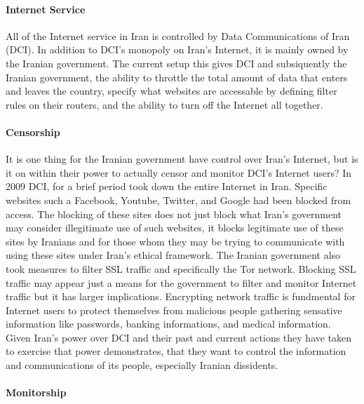 \documentclass[11pt]{article}
\begin{document}
\begin{multicols}{2}
\paragraph{Internet Service}

All of the Internet service in Iran is controlled by Data Communications of Iran
(DCI). \cite{FindingWayAroundIranianCensorship} In addition to DCI's monopoly on
Iran's Internet, it is mainly owned by the Iranian government.
\cite{FindingWayAroundIranianCensorship, DCI:Articles} The current setup this
gives DCI and subsiquently the Iranian government, the ability to throttle the
total amount of data that enters and leaves the country, specify what websites
are accessable by defining filter rules on their routers, and the ability to
turn off the Internet all together. \cite{FindingWayAroundIranianCensorship}

\paragraph{Censorship} 

It is one thing for the Iranian government have control over Iran's
Internet, but is it on within their power to actually censor and monitor DCI's
Internet users? In 2009 DCI, for a brief period took down the entire Internet in 
Iran. \cite{FindingWayAroundIranianCensorship} Specific websites such a
Facebook, Youtube, Twitter, and Google had been blocked from access.
\cite{FindingWayAroundIranianCensorship, IransElectronicCurtain} The blocking of
these sites does not just block what Iran's government may consider illegitimate
use of such websites, it  blocks legitimate use of these sites by Iranians and
for those whom they may be trying to communicate with using these sites under
Iran's ethical framework. The Iranian government also took measures to filter
SSL traffic and specifically the Tor network.  \cite{Tor:IranPartiallyBlocksSSL,
IranBlocksTorSameDayFix} Blocking SSL traffic may appear just a means for the
government to filter and monitor Internet traffic but it has larger
implications. Encrypting network traffic is fundmental for Internet users to
protect themselves from malicious people gathering sensative information like
passwords, banking informations, and medical information. Given Iran's power
over DCI and their past and current actions they have taken to exercise that
power demonstrates, that they want to control the information and communications
of its people, especially Iranian dissidents.

\paragraph{Monitorship}


\end{multicols}
\end{document}
